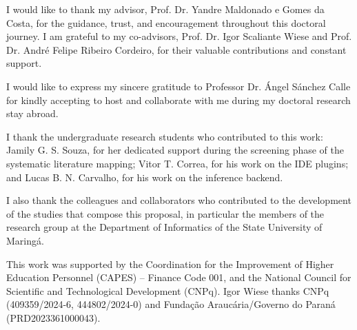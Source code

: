 I would like to thank my advisor, Prof. Dr. Yandre Maldonado e Gomes da Costa, for the guidance, trust, and encouragement throughout this doctoral journey. I am grateful to my co-advisors, Prof. Dr. Igor Scaliante Wiese and Prof. Dr. André Felipe Ribeiro Cordeiro, for their valuable contributions and constant support.

I would like to express my sincere gratitude to Professor Dr. Ángel Sánchez Calle for kindly accepting to host and collaborate with me during my doctoral research stay abroad.

I thank the undergraduate research students who contributed to this work: Jamily G. S. Souza, for her dedicated support during the screening phase of the systematic literature mapping; Vitor T. Correa, for his work on the IDE plugins; and Lucas B. N. Carvalho, for his work on the inference backend.

I also thank the colleagues and collaborators who contributed to the development of the studies that compose this proposal, in particular the members of the research group at the Department of Informatics of the State University of Maringá.

This work was supported by the Coordination for the Improvement of Higher Education Personnel (CAPES) -- Finance Code 001, and the National Council for Scientific and Technological Development (CNPq). Igor Wiese thanks CNPq (409359/2024-6, 444802/2024-0) and Fundação Araucária/Governo do Paraná (PRD2023361000043).
